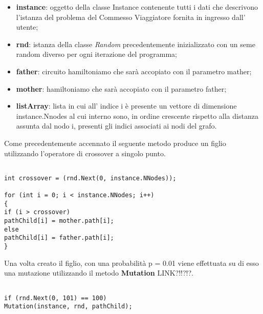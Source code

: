 \documentclass[11pt]{article}
\begin{document}
\begin{itemize}
    \item \textbf{instance}: oggetto della classe Instance contenente tutti i dati che descrivono l'istanza del problema del Commesso Viaggiatore fornita in ingresso dall' utente;
    \item \textbf{rnd}: istanza della classe \textit{Random} precedentemente inizializzato con un seme random diverso per ogni iterazione del programma;
    \item \textbf{father}: circuito hamiltoniamo che sarà accopiato con il parametro mather;
    \item \textbf{mother}: hamiltoniamo che sarà accopiato con il parametro father;
    \item \textbf{listArray}: lista in cui all’ indice i è presente un vettore di dimensione instance.Nnodes al cui interno sono, in ordine crescente rispetto alla distanza assunta dal nodo i, presenti gli indici associati ai nodi del grafo.
\end{itemize}

Come precedentemente accennato il seguente metodo produce un figlio utilizzando l'operatore di crossover a singolo punto.

\begin{lstlisting}

int crossover = (rnd.Next(0, instance.NNodes));

for (int i = 0; i < instance.NNodes; i++)
{
if (i > crossover)
pathChild[i] = mother.path[i];
else
pathChild[i] = father.path[i];
}

\end{lstlisting}


Una volta creato il figlio, con una probabilità p = 0.01 viene effettuata su di esso una mutazione utilizzando il metodo \textbf{Mutation} LINK?!!?!?.


\begin{lstlisting}

if (rnd.Next(0, 101) == 100)
Mutation(instance, rnd, pathChild);

\end{lstlisting}
\end{document}
